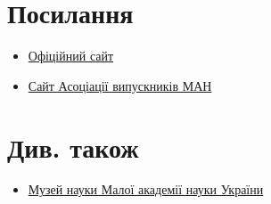 \documentclass[
  letterpaper,
  DIV=11,
  numbers=noendperiod,
  oneside]{scrartcl}
\providecommand{\tightlist}{%
  \setlength{\itemsep}{0pt}\setlength{\parskip}{0pt}}\usepackage{longtable,booktabs,array}
\begin{document}
\hypertarget{ux43fux43eux441ux438ux43bux430ux43dux43dux44f}{%
\section{Посилання}\label{ux43fux43eux441ux438ux43bux430ux43dux43dux44f}}

\begin{itemize}
\tightlist
\item
  \href{http://man.gov.ua/}{Офіційний сайт}
\item
  \href{http://av.man.gov.ua/}{Сайт Асоціації випускників МАН}
\end{itemize}

\hypertarget{ux434ux438ux432.-ux442ux430ux43aux43eux436}{%
\section{Див. також}\label{ux434ux438ux432.-ux442ux430ux43aux43eux436}}

\begin{itemize}
\tightlist
\item
  \href{https://uk.wikipedia.org/wiki/\%D0\%9C\%D1\%83\%D0\%B7\%D0\%B5\%D0\%B9_\%D0\%BD\%D0\%B0\%D1\%83\%D0\%BA\%D0\%B8_(\%D0\%9A\%D0\%B8\%D1\%97\%D0\%B2)}{Музей
  науки Малої академії науки України}
\end{itemize}
\end{document}
